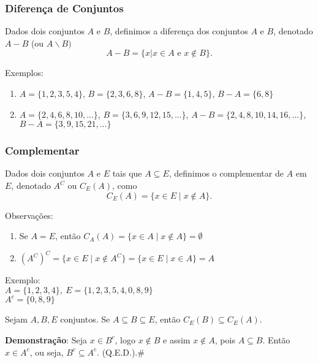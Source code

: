 \subsubsection{Diferen{\c c}a de Conjuntos}
\begin{definicao} Dados dois conjuntos $A$ e $B$, definimos a diferen{\c c}a dos conjuntos $A$ e $B$, denotado $A-B$ (ou $A\backslash B)$
\[A - B = \{x | x \in A \mbox{ e } x \notin B\}.\]
\end{definicao}

Exemplos:
\begin{enumerate}
\item $A=\{1,2,3,5,4\}$, $B=\{2,3,6,8\}$, $A-B=\{1,4,5\}$, $B-A=\{6,8\}$
\item $A=\{2,4,6,8,10,...\}$,  $B=\{3,6,9,12,15,...\}$, $A-B=\{2,4,8,10,14,16,...\}$, $B - A=\{3,9,15,21,...\}$
\end{enumerate}

\subsubsection{Complementar}

\begin{definicao}[Complementar] Dados dois conjuntos $A$ e $E$ tais que $A\subseteq E$, definimos o complementar de $A$ em $E$, denotado $A^{C}$ ou $C_{E}(A)$, como
\[C_{E}(A) = \{ x \in E \mid x \notin A \}.\]
\end{definicao}

Observa{\c c}{\~o}es:
\begin{enumerate}
\item Se $A = E$, ent{\~a}o $C_{A}(A)=\{ x \in A \mid x \notin A \}=\emptyset$
\item $(A^{C})^{C}=\{x \in E \mid x \notin A^{C}\} = \{ x \in E \mid x \in A \}=A$
\end{enumerate}

Exemplo:\\
$A=\{1,2,3,4\},\ E=\{1,2,3,5,4,0,8,9\}$\\
$A^{c}=\{0,8,9\}$

\begin{proposicao} Sejam $A,B,E$ conjuntos. Se $A\subseteq B\subseteq E$, ent{\~a}o $C_{E}(B)\subseteq C_{E}(A)$.\end{proposicao}

\textbf{Demonstra{\c c}{\~a}o}: Seja $x\in B^{c}$, logo $x\notin B$ e assim $x\notin A$, pois $A\subseteq B$. Ent{\~a}o $x\in A^{c}$, ou seja, $B^{c}\subseteq A^{c}$. (Q.E.D.).\#\\

